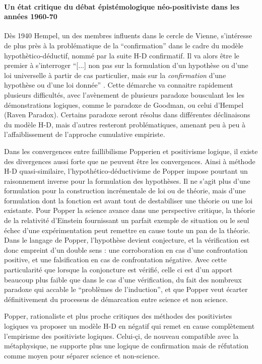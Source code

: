\paragraph{Un état critique du débat épistémologique néo-positiviste dans les années 1960-70}

Dès 1940 Hempel, un des membres influents dans le cercle de Vienne, s'intéresse de plus près à la problématique de la \enquote{confirmation} dans le cadre du modèle hypothètico-déductif, nommé par la suite H-D confirmatif. Il va alors être le premier à s'interroger \enquote{[...] non pas sur la formulation d'un hypothèse ou d'une loi universelle à partir de cas particulier, mais sur la \textit{confirmation} d'une hypothèse ou d'une loi donnée} \autocite{Lecourt2006}. Cette démarche va connaitre rapidement plusieurs difficultés, avec l’avènement de plusieurs paradoxe bousculant les les démonstrations logiques, comme le paradoxe de Goodman, ou celui d'Hempel (Raven Paradox). Certains paradoxe seront résolus dans différentes déclinaisons du modèle H-D, mais d'autres resteront problématiques, amenant peu à peu à l'affaiblissement de l'approche cumulative empiriste. 

Dans les convergences entre faillibilisme Popperien et positivisme logique, il existe des divergences aussi forte que ne peuvent être les convergences. Ainsi à méthode H-D quasi-similaire, l'hypothético-déductivisme de Popper impose pourtant un raisonnement inverse pour la formulation des hypothèses. Il ne s'agit plus d'une formulation pour la construction incrémentale de loi ou de théorie, mais d'une formulation dont la fonction est avant tout de destabiliser une théorie ou une loi existante. Pour Popper la science avance dans une perspective critique, la théorie de la relativité d'Einstein fournissant un parfait exemple de situation ou le seul échec d'une expérimentation peut remettre en cause toute un pan de la théorie. Dans le langage de Popper, l'hypothèse devient conjecture, et la vérification est donc empreint d'un double sens : une corroboration en cas d'une confrontation positive, et une falsification en cas de confrontation négative. Avec cette particularité que lorsque la conjoncture est vérifié, celle ci est d'un apport beaucoup plus faible que dans le cas d'une vérification, du fait des nombreux paradoxe qui accable le \enquote{problèmes de l'induction}, et que Popper veut écarter définitivement du processus de démarcation entre science et non science.

Popper, rationaliste et plus proche critiques des méthodes des positivistes logiques va proposer un modèle H-D en négatif qui remet en cause complètement l'empirisme des positiviste logiques. Celui-çi, de nouveau compatible avec la métaphysique, ne supporte plus une logique de confirmation mais de réfutation comme moyen pour séparer science et non-science.


